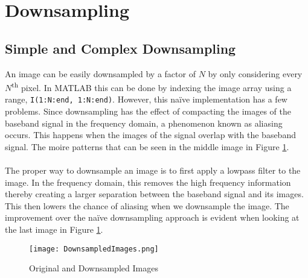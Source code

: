 \section{Downsampling}
\subsection{Simple and Complex Downsampling}
An image can be easily downsampled by a factor of $N$ by only considering every $N$\textsuperscript{th} pixel. In MATLAB this can be done by indexing the image array using a range, \lstinline|I(1:N:end, 1:N:end)|. However, this naïve implementation has a few problems. Since downsampling has the effect of compacting the images of the baseband signal in the frequency domain, a phenomenon known as aliasing occurs. This happens when the images of the signal overlap with the baseband signal. The moire patterns that can be seen in the middle image in Figure \ref{fig:DownsampledImages}. \\ \\
The proper way to downsample an image is to first apply a lowpass filter to the image. In the frequency domain, this removes the high frequency information thereby creating a larger separation between the baseband signal and its images. This then lowers the chance of aliasing when we downsample the image. The improvement over the naïve downsampling approach is evident when looking at the last image in Figure \ref{fig:DownsampledImages}.
\begin{figure}[H]
    \texttt{[image: DownsampledImages.png]}
    \centering
    \caption{Original and Downsampled Images}
    \label{fig:DownsampledImages}
\end{figure}